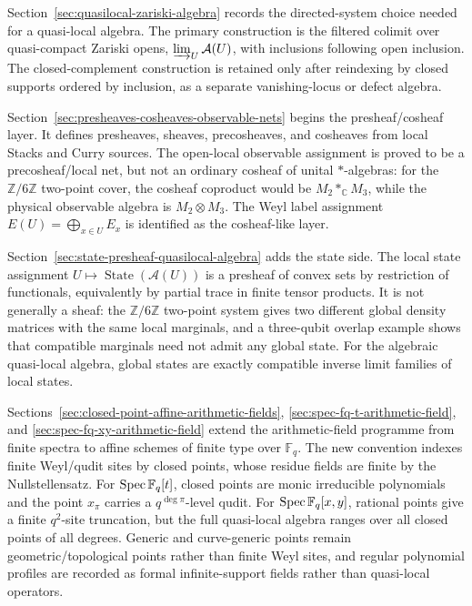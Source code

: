 Section~\ref{sec:quasilocal-zariski-algebra} records the directed-system
choice needed for a quasi-local algebra.  The primary construction is the
filtered colimit over quasi-compact Zariski opens,
\(\varinjlim_U\mathcal A(U)\), with inclusions following open inclusion.
The closed-complement construction is retained only after reindexing by
closed supports ordered by inclusion, as a separate vanishing-locus or defect
algebra.

Section~\ref{sec:presheaves-cosheaves-observable-nets} begins the
presheaf/cosheaf layer.  It defines presheaves, sheaves, precosheaves, and
cosheaves from local Stacks and Curry sources.  The open-local observable
assignment is proved to be a precosheaf/local net, but not an ordinary cosheaf
of unital \(*\)-algebras: for the \(\mathbb Z/6\mathbb Z\) two-point cover,
the cosheaf coproduct would be \(M_2*_{\mathbb C}M_3\), while the physical
observable algebra is \(M_2\otimes M_3\).  The Weyl label assignment
\(E(U)=\bigoplus_{x\in U}E_x\) is identified as the cosheaf-like layer.

Section~\ref{sec:state-presheaf-quasilocal-algebra} adds the state side.  The
local state assignment \(U\mapsto\operatorname{State}(\mathcal A(U))\) is a
presheaf of convex sets by restriction of functionals, equivalently by partial
trace in finite tensor products.  It is not generally a sheaf: the
\(\mathbb Z/6\mathbb Z\) two-point system gives two different global density
matrices with the same local marginals, and a three-qubit overlap example
shows that compatible marginals need not admit any global state.  For the
algebraic quasi-local algebra, global states are exactly compatible inverse
limit families of local states.

Sections~\ref{sec:closed-point-affine-arithmetic-fields},
\ref{sec:spec-fq-t-arithmetic-field}, and
\ref{sec:spec-fq-xy-arithmetic-field} extend the arithmetic-field programme
from finite spectra to affine schemes of finite type over \(\mathbb F_q\).
The new convention indexes finite Weyl/qudit sites by closed points, whose
residue fields are finite by the Nullstellensatz.  For
\(\operatorname{Spec}\mathbb F_q[t]\), closed points are monic irreducible polynomials and
the point \(x_\pi\) carries a \(q^{\deg\pi}\)-level qudit.  For
\(\operatorname{Spec}\mathbb F_q[x,y]\), rational points give a finite \(q^2\)-site
truncation, but the full quasi-local algebra ranges over all closed points of
all degrees.  Generic and curve-generic points remain geometric/topological
points rather than finite Weyl sites, and regular polynomial profiles are
recorded as formal infinite-support fields rather than quasi-local operators.

